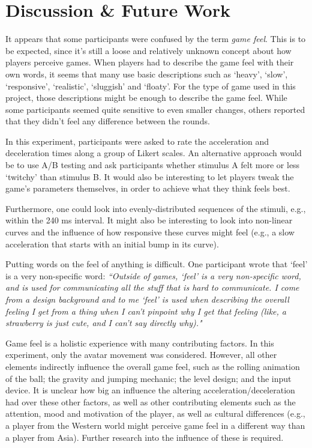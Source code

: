 \section{Discussion \& Future Work} \label{discussion}
It appears that some participants were confused by the term \textit{game feel}. This is to be expected, since it's still a loose and relatively unknown concept about how players perceive games. When players had to describe the game feel with their own words, it seems that many use basic descriptions such as `heavy', `slow', `responsive', `realistic', `sluggish' and `floaty'. For the type of game used in this project, those descriptions might be enough to describe the game feel. While some participants seemed quite sensitive to even smaller changes, others reported that they didn't feel any difference between the rounds.

In this experiment, participants were asked to rate the acceleration and deceleration times along a group of Likert scales. An alternative approach would be to use A/B testing and ask participants whether stimulus A felt more or less `twitchy' than stimulus B. It would also be interesting to let players tweak the game's parameters themselves, in order to achieve what they think feels best.

Furthermore, one could look into evenly-distributed sequences of the stimuli, e.g., within the 240 ms interval. It might also be interesting to look into non-linear curves and the influence of how responsive these curves might feel (e.g., a slow acceleration that starts with an initial bump in its curve).

Putting words on the feel of anything is difficult. One participant wrote that `feel' is a very non-specific word: \textit{``Outside of games, `feel' is a very non-specific word, and is used for communicating all the stuff that is hard to communicate. I come from a design background and to me `feel' is used when describing the overall feeling I get from a thing when I can't pinpoint why I get that feeling (like, a strawberry is just cute, and I can't say directly why)."}

Game feel is a holistic experience with many contributing factors. In this experiment, only the avatar movement was considered. However, all other elements indirectly influence the overall game feel, such as the rolling animation of the ball; the gravity and jumping mechanic; the level design; and the input device. It is unclear how big an influence the altering acceleration/deceleration had over these other factors, as well as other contributing elements such as the attention, mood and motivation of the player, as well as cultural differences (e.g., a player from the Western world might perceive game feel in a different way than a player from Asia). Further research into the influence of these is required.
